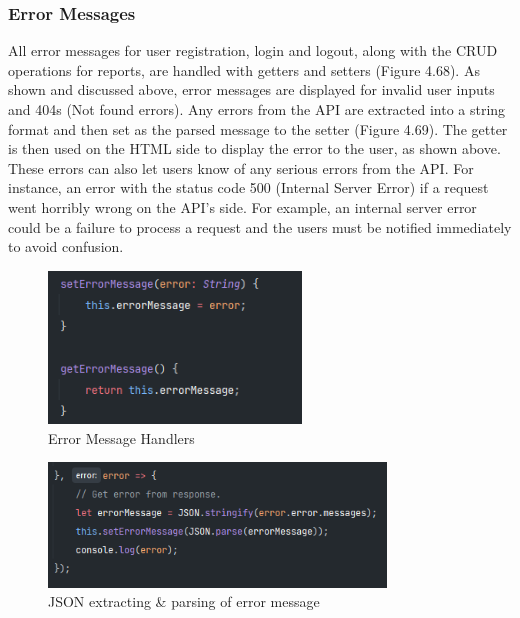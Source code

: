 \subsubsection{Error Messages}
All error messages for user registration, login and logout, along with the CRUD operations for reports, are handled with getters and setters (Figure 4.68). As shown and discussed above, error messages are displayed for invalid user inputs and 404s (Not found errors). Any errors from the API are extracted into a string format and then set as the parsed message to the setter (Figure 4.69). The getter is then used on the HTML side to display the error to the user, as shown above. These errors can also let users know of any serious errors from the API. For instance, an error with the status code 500 (Internal Server Error) if a request went horribly wrong on the API's side. For example, an internal server error could be a failure to process a request and the users must be notified immediately to avoid confusion.

\begin{figure}[H]
    \centering
    \caption{Error Message Handlers}
    \label{image:errorMessageHandlers}
    \includegraphics[width=0.6\textwidth]{images/repota/report_pages/error_handlers.png}
\end{figure}

\begin{figure}[H]
    \centering
    \caption{JSON extracting \& parsing of error message}
    \label{image:letError}
    \includegraphics[width=0.8\textwidth]{images/repota/report_pages/let_error.png}
\end{figure}

